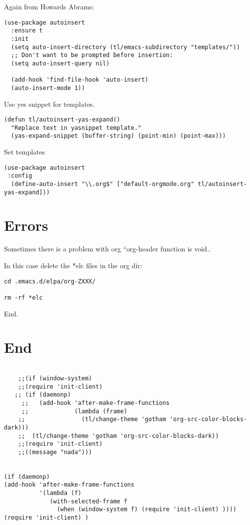 \documentclass[12pt]{article}
\begin{document}
Again from Howards Abrams: 
\lstset{language=Lisp,label= ,caption= ,captionpos=b,numbers=none}
\begin{lstlisting}
(use-package autoinsert
  :ensure t
  :init
  (setq auto-insert-directory (tl/emacs-subdirectory "templates/"))
  ;; Don't want to be prompted before insertion:
  (setq auto-insert-query nil)

  (add-hook 'find-file-hook 'auto-insert)
  (auto-insert-mode 1))

\end{lstlisting}

Use yes snippet for templates. 

\lstset{language=Lisp,label= ,caption= ,captionpos=b,numbers=none}
\begin{lstlisting}
(defun tl/autoinsert-yas-expand()
  "Replace text in yasnippet template."
  (yas-expand-snippet (buffer-string) (point-min) (point-max)))
\end{lstlisting}

Set templates

\lstset{language=Lisp,label= ,caption= ,captionpos=b,numbers=none}
\begin{lstlisting}
(use-package autoinsert 
 :config
  (define-auto-insert "\\.org$" ["default-orgmode.org" tl/autoinsert-yas-expand]))
\end{lstlisting}

\section{Errors}
\label{sec:org4d5f75d}

Sometimes there is a problem with org ``org-header function is void..

In this case delete the *elc files in the org dir:

\begin{verbatim}
cd .emacs.d/elpa/org-ZXXX/

rm -rf *elc
\end{verbatim}


End. 

\section{End}
\label{sec:orgeb6e1dd}

\lstset{language=Lisp,label= ,caption= ,captionpos=b,numbers=none}
\begin{lstlisting}

    ;;(if (window-system)
    ;;(require 'init-client) 
   ;; (if (daemonp)
     ;;   (add-hook 'after-make-frame-functions
     ;;             (lambda (frame)
    ;;                (tl/change-theme 'gotham 'org-src-color-blocks-dark)))
    ;;  (tl/change-theme 'gotham 'org-src-color-blocks-dark))
    ;;(require 'init-client)
    ;;((message "nada"))) 


(if (daemonp)
(add-hook 'after-make-frame-functions
          '(lambda (f)
             (with-selected-frame f
               (when (window-system f) (require 'init-client) ))))
(require 'init-client) )



\end{lstlisting}
\end{document}
